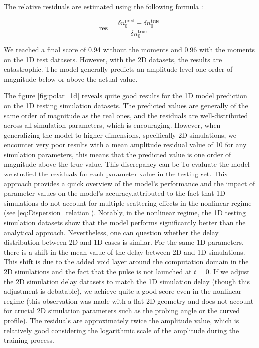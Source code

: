 \documentclass[11pt,openany]{report}
\begin{document}
\begin{multicols}{2}
    The relative residuals are estimated using the following formula :

    $$\text{res} = \frac{ \delta n_0^\text{pred} - \delta n_0^\text{true}}{\delta n_0^\text{true}}$$

    We reached a final score of 0.94 without the moments and 0.96 with the moments on the 1D test datasets. However, with the 2D datasets, the results are catastrophic. The model generally predicts an amplitude level one order of magnitude below or above the actual value.

    The figure \ref{fig:polar_1d} reveals quite good results for the 1D model prediction on the 1D testing simulation datasets. The predicted values are generally of the same order of magnitude as the real ones, and the residuals are well-distributed across all simulation parameters, which is encouraging. However, when generalizing the model to higher dimensions, specifically 2D simulations, we encounter very poor results with a mean amplitude residual value of 10 for any simulation parameters, this means that the predicted value is one order of magnitude above the true value. This discrepancy can be To evaluate the model we studied the residuals for each parameter value in the testing set. This approach provides a quick overview of the model's performance and the impact of parameter values on the model's accuracy.attributed to the fact that 1D simulations do not account for multiple scattering effects in the nonlinear regime (see \ref{eq:Dispersion_relation}). Notably, in the nonlinear regime, the 1D testing simulation datasets show that the model performs significantly better than the analytical approach. Nevertheless, one can question whether the delay distribution between 2D and 1D cases is similar. For the same 1D parameters, there is a shift in the mean value of the delay between 2D and 1D simulations. This shift is due to the added void layer around the computation domain in the 2D simulations \cite{SPR_Krutkin} and the fact that the pulse is not launched at $t=0$. If we adjust the 2D simulation delay datasets to match the 1D simulation delay (though this adjustment is debatable), we achieve quite a good score even in the nonlinear regime (this observation was made with a flat 2D geometry and does not account for crucial 2D simulation parameters such as the probing angle or the curved profile). The residuals are approximately twice the amplitude value, which is relatively good considering the logarithmic scale of the amplitude during the training process.


\end{multicols}
\end{document}
